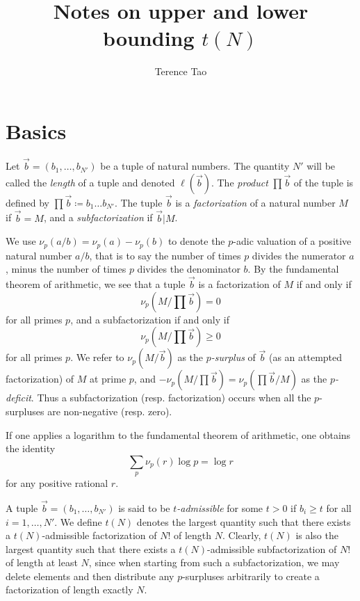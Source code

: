 \documentclass[12pt,a4paper,reqno]{amsart}
\numberwithin{equation}{section}
\theoremstyle{plain}
\theoremstyle{definition}
\begin{document}
\title{Notes on upper and lower bounding $t(N)$}

\author{Terence Tao}
\maketitle


\section{Basics}

Let $\vec b = (b_1,\dots,b_{N'})$ be a tuple of natural numbers.  The quantity $N'$ will be called the \emph{length} of a tuple and denoted $\ell(\vec b)$.  The \emph{product} $\prod \vec b$ of the tuple is defined by $\prod \vec b \coloneqq b_1 \dots b_{N'}$.  The tuple $\vec b$ is a \emph{factorization} of a natural number $M$ if $\vec b = M$, and a \emph{subfactorization} if $\vec b | M$.

We use $\nu_p(a/b) = \nu_p(a)-\nu_p(b)$ to denote the $p$-adic valuation of a positive natural number $a/b$, that is to say the number of times $p$ divides the numerator $a$, minus the number of times $p$ divides the denominator $b$.  By the fundamental theorem of arithmetic, we see that a tuple $\vec b$ is a factorization of $M$ if and only if
$$ \nu_p( M / \prod \vec b ) = 0$$
for all primes $p$, and a subfactorization if and only if
$$ \nu_p( M / \prod \vec b ) \geq 0$$
for all primes $p$.  We refer to $\nu_p( M / \vec b )$ as the \emph{$p$-surplus} of $\vec b$ (as an attempted factorization) of $M$ at prime $p$, and $-\nu_p(M/\prod\vec b) = \nu_p(\prod\vec b/M)$ as the \emph{$p$-deficit}.  Thus a subfactorization (resp. factorization) occurs when all the $p$-surpluses are non-negative (resp. zero).

If one applies a logarithm to the fundamental theorem of arithmetic, one obtains the identity
\begin{equation}\label{ftoa}
  \sum_p \nu_p(r) \log p = \log r
\end{equation}
for any positive rational $r$.

A tuple $\vec b = (b_1,\dots,b_{N'})$ is said to be \emph{$t$-admissible} for some $t>0$ if $b_i \geq t$ for all $i=1,\dots,N'$.  We define $t(N)$ denotes the largest quantity such that there exists a $t(N)$-admissible factorization of $N!$ of length $N$.  Clearly, $t(N)$ is also the largest quantity such that there exists a $t(N)$-admissible subfactorization of $N!$ of length at least $N$, since when starting from such a subfactorization, we may delete elements and then distribute any $p$-surpluses arbitrarily to create a factorization of length exactly $N$.
\end{document}
